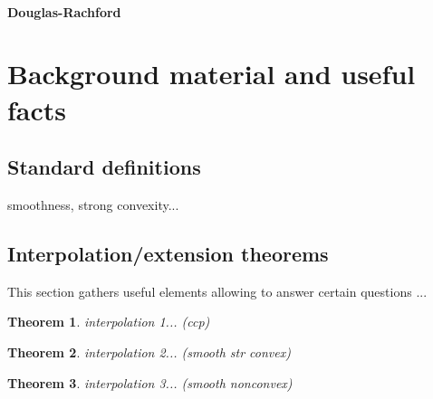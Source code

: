 \documentclass[11pt,a4paper]{article}
\newtheorem{theorem}{Theorem}
\begin{document}
	\paragraph{Douglas-Rachford}
	
	
	\section{Background material and useful facts}			%
	\subsection{Standard definitions}
	smoothness, strong convexity...
	
	\subsection{Interpolation/extension theorems}
	This section gathers useful elements allowing to answer certain questions ...
	\begin{theorem}
	interpolation 1... (ccp)
	\end{theorem}
	\begin{theorem}
	interpolation 2... (smooth str convex)
	\end{theorem}
	\begin{theorem}
	interpolation 3... (smooth nonconvex)
	\end{theorem}
	

{}
\end{document}
